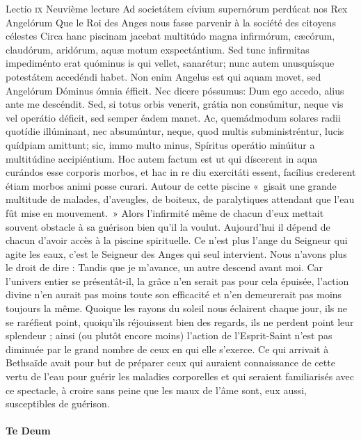 \documentclass[twoside]{article}
\begin{document}
\begin{paracol}[1]{2}
\lectioresponsorium
	{Lectio \textsc{ix}}
	{Neuvième lecture}
	{Ad societátem cívium supernórum perdúcat nos Rex Angelórum}
	{Que le Roi des Anges nous fasse parvenir à la société des citoyens célestes}
	{
		Circa hanc piscinam jacebat multitúdo magna infirmórum, cæcórum, claudórum, aridórum, aquæ motum exspectántium. Sed tunc infirmitas impediménto erat quóminus is qui vellet, sanarétur; nunc autem unusquísque potestátem accedéndi habet. Non enim Angelus est qui aquam movet, sed Angelórum Dóminus ómnia éfficit. Nec dicere póssumus: Dum ego accedo, alius ante me descéndit. Sed, si totus orbis venerit, grátia non consúmitur, neque vis vel operátio déficit, sed semper éadem manet. Ac, quemádmodum solares radii quotídie illúminant, nec absumúntur, neque, quod multis subministréntur, lucis quídpiam amittunt; sic, immo multo minus, Spíritus operátio minúitur a multitúdine accipiéntium. Hoc autem factum est ut qui díscerent in aqua curándos esse corporis morbos, et hac in re diu exercitáti essent, facílius crederent étiam morbos animi posse curari.
	}
	{
		Autour de cette piscine «~gisait une grande multitude de malades, d’aveugles, de boiteux, de paralytiques attendant que l’eau fût mise en mouvement.~» Alors l’infirmité même de chacun d’eux mettait souvent obstacle à sa guérison bien qu’il la voulut. Aujourd’hui il dépend de chacun d’avoir accès à la piscine spirituelle. Ce n’est plus l’ange du Seigneur qui agite les eaux, c’est le Seigneur des Anges qui seul intervient. Nous n’avons plus le droit de dire : Tandis que je m’avance, un autre descend avant moi. Car l’univers entier se présentât-il, la grâce n’en serait pas pour cela épuisée, l’action divine n’en aurait pas moins toute son efficacité et n’en demeurerait pas moins toujours la même. Quoique les rayons du soleil nous éclairent chaque jour, ils ne se raréfient point, quoiqu’ils réjouissent bien des regards, ils ne perdent point leur splendeur ; ainsi (ou plutôt encore moins) l’action de l’Esprit-Saint n’est pas diminuée par le grand nombre de ceux en qui elle s’exerce. Ce qui arrivait à Bethsaïde avait pour but de préparer ceux qui auraient connaissance de cette vertu de l’eau pour guérir les maladies corporelles et qui seraient familiarisés avec ce spectacle, à croire sans peine que les maux de l’âme sont, eux aussi, susceptibles de guérison.
	}
	{}
	{}
	
\paragraph{Te Deum}
	

\end{paracol}
\end{document}
